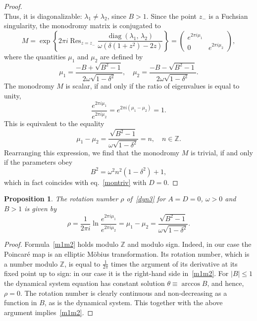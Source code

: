 \documentclass[preprint,12pt]{elsarticle}
\theoremstyle{plain}
\newtheorem{proposition}[theorem]{Proposition}
\DeclareMathOperator{\diag}{\mathrm{diag}}
\numberwithin{equation}{section}
\numberwithin{equation}{section}
\begin{document}
\begin{proof}
\begin{equation}
\end{equation}
Thus, it is diagonalizable: $\lambda_1\neq \lambda_2$, since $B>1$. 
Since the point $z_{-}$ is a Fuchsian singularity, the monodromy matrix is conjugated to 
\begin{equation}
    M = \exp\left\{2\pi i\mathop{\text{Res}}_{z=z_{-}}\frac{\diag(\lambda_1,\,\lambda_2)}{\omega(\delta(1+z^2)-2z)}\right\}=
    \begin{pmatrix}e^{2\pi i\mu_1} & \\ 0 & e^{2\pi i\mu_2}\end{pmatrix},
\end{equation}
where the quantities $\mu_1$ and $\mu_2$ are defined by
\begin{equation}
    \mu_1=\frac{-B+\sqrt{B^2-1}}{2\omega\sqrt{1-\delta^2}},\quad \mu_2=\frac{-B-\sqrt{B^2-1}}{2\omega\sqrt{1-\delta^2}}.
\end{equation}
The monodromy $M$ is scalar, if and only if the ratio of eigenvalues is equal to unity,
\begin{equation*}
    \frac{e^{2\pi i\mu_1}}{e^{2\pi i\mu_2}}=e^{2\pi i(\mu_1-\mu_2)}=1.
\end{equation*}
This is equivalent to the equality
\begin{equation}
   \mu_1-\mu_2= \frac{\sqrt{B^2-1}}{\omega\sqrt{1-\delta^2}}=n,\quad n\in\mathbb{Z}.
\end{equation}
Rearranging this expression, we find that the monodromy $M$ is trivial,  if and only if the parameters obey
\begin{equation}
    B^2=\omega^2n^2\left(1-\delta^2\right)+1,
\end{equation}
which in fact coincides with eq.~\eqref{montriv} with $D=0$.
\end{proof}

\begin{proposition} \label{crot}
The rotation number $\rho$ of~\eqref{dyn3} for $A=D=0$, $\omega>0$ and  $B>1$ is given by
\begin{equation}
    \rho = \frac{1}{2\pi i}\ln\frac{e^{2\pi i\mu_1}}{e^{2\pi i\mu_2}}=\mu_1-\mu_2 = \frac{\sqrt{B^2-1}}{\omega\sqrt{1-\delta^2}}.\label{m1m2}
\end{equation}
\end{proposition}
\begin{proof} Formula~\eqref{m1m2} holds modulo $\mathbb{Z}$ and modulo sign.  Indeed,  in our case the Poincar\'e map is an elliptic M\"obius transformation. Its rotation number, which is a number modulo $\mathbb Z$, is equal to $\frac1{2\pi}$ times the argument of its  derivative at its fixed point up to sign: in our case it is the right-hand side in~\eqref{m1m2}.  For $|B|\leq1$ the dynamical system equation has constant solution $\theta\equiv\arccos B$, and hence, $\rho=0$. The rotation number is clearly continuous and non-decreasing as a function in $B$, as is the dynamical system. This together with the above argument implies~\eqref{m1m2}.
\end{proof}
\end{document}

